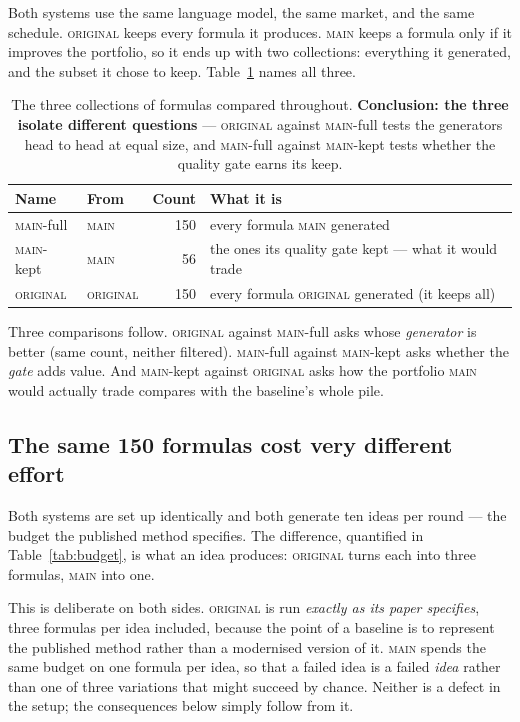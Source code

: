 \documentclass[11pt]{article}
\newcommand{\main}{\textsc{main}}
\newcommand{\orig}{\textsc{original}}
\begin{document}
Both systems use the same language model, the same market, and the same schedule.
\orig{} keeps every formula it produces. \main{} keeps a formula only if it improves
the portfolio, so it ends up with two collections: everything it generated, and the
subset it chose to keep. Table~\ref{tab:libraries} names all three.

\begin{table}[h]
\centering\small
\begin{tabular}{llrl}
\toprule
Name & From & Count & What it is \\
\midrule
\main{}-full & \main{} & 150 & every formula \main{} generated \\
\main{}-kept & \main{} & 56  & the ones its quality gate kept --- what it would trade \\
\orig{}      & \orig{} & 150 & every formula \orig{} generated (it keeps all) \\
\bottomrule
\end{tabular}
\caption{The three collections of formulas compared throughout.
\textbf{Conclusion: the three isolate different questions} --- \orig{} against
\main{}-full tests the generators head to head at equal size, and \main{}-full against
\main{}-kept tests whether the quality gate earns its keep.}
\label{tab:libraries}
\end{table}

\noindent Three comparisons follow. \orig{} against \main{}-full asks whose
\emph{generator} is better (same count, neither filtered). \main{}-full against
\main{}-kept asks whether the \emph{gate} adds value. And \main{}-kept against
\orig{} asks how the portfolio \main{} would actually trade compares with the
baseline's whole pile.

\subsection{The same 150 formulas cost very different effort}
\label{sub:budget}

Both systems are set up identically and both generate ten ideas per round --- the
budget the published method specifies. The difference, quantified in
Table~\ref{tab:budget}, is what an idea produces: \orig{} turns each into three
formulas, \main{} into one.

This is deliberate on both sides. \orig{} is run \emph{exactly as its paper specifies},
three formulas per idea included, because the point of a baseline is to represent the
published method rather than a modernised version of it. \main{} spends the same budget
on one formula per idea, so that a failed idea is a failed \emph{idea} rather than one
of three variations that might succeed by chance. Neither is a defect in the setup; the
consequences below simply follow from it.
\end{document}
